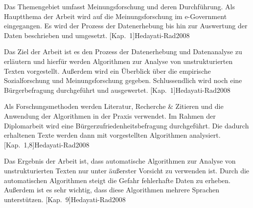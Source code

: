 

 Das Themengebiet umfasst Meinungsforschung und deren Durchführung. Als Hauptthema der Arbeit wird
auf die Meinungsforschung im e-Government eingegangen. Es wird der Prozess der Datenerhebung bis hin zur Auswertung
der Daten beschrieben und umgesetzt. [Kap.~1]{Hedayati-Rad2008}

 Das Ziel der Arbeit ist es den Prozess der Datenerhebung und Datenanalyse zu erläutern und
hierfür werden Algorithmen zur Analyse von unstrukturierten Texten vorgestellt. Außerdem wird ein Überblick über die
empirische Sozialforschung und Meinungsforschung gegeben. Schlussendlich wird noch eine Bürgerbefragung durchgeführt 
und ausgewertet. [Kap.~1]{Hedayati-Rad2008}

 Als Forschungsmethoden werden Literatur, Recherche & Zitieren und die Anwendung der
Algorithmen in der Praxis verwendet. Im Rahmen der Diplomarbeit wird eine Bürgerzufriedenheitsbefragung durchgeführt. 
Die dadurch erhaltenen Texte werden dann mit vorgestellten Algorithmen analysiert. [Kap.~1,8]{Hedayati-Rad2008}

 Das Ergebnis der Arbeit ist, dass automatische Algorithmen zur Analyse von unstrukturierten Texten 
nur unter äußerster Vorsicht zu verwenden ist. Durch die automatischen Algorithmen steigt die Gefahr fehlerhafte Daten
zu erheben. Außerdem ist es sehr wichtig, dass diese Algorithmen mehrere Sprachen unterstützen. [Kap.~9]{Hedayati-Rad2008}


%
\section*{\thesisheading} %


